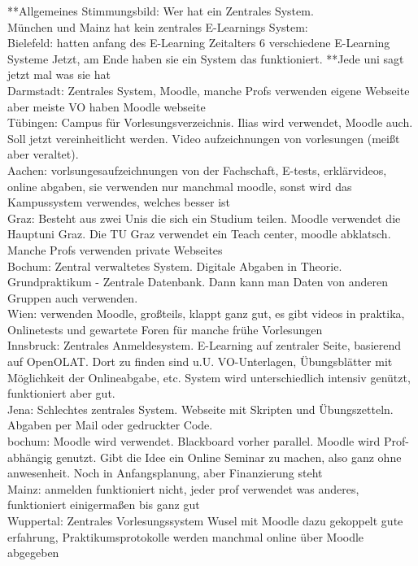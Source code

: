 \begin{itemize}
{\begin{itemize}
**Allgemeines Stimmungsbild: Wer hat ein Zentrales System.
 \\
München und Mainz hat kein zentrales E-Learnings System:  \\
Bielefeld: hatten anfang des E-Learning Zeitalters 6 verschiedene E-Learning Systeme
Jetzt, am Ende haben sie ein System das funktioniert.
**Jede uni sagt jetzt mal was sie hat
 \\
Darmstadt: Zentrales System, Moodle, manche Profs verwenden eigene Webseite aber meiste VO haben Moodle webseite \\
Tübingen: Campus für Vorlesungsverzeichnis. Ilias wird verwendet, Moodle auch. Soll jetzt vereinheitlicht werden. Video aufzeichnungen von vorlesungen (meißt aber veraltet). \\
Aachen: vorlsungesaufzeichnungen von der Fachschaft, E-tests, erklärvideos, online abgaben, sie verwenden nur manchmal moodle, sonst wird das Kampussystem verwendes, welches besser ist \\
Graz: Besteht aus zwei Unis die sich ein Studium teilen. Moodle verwendet die Hauptuni Graz. Die TU Graz verwendet ein Teach center, moodle abklatsch. Manche Profs verwenden private Webseites \\
Bochum: Zentral verwaltetes System. Digitale Abgaben in Theorie. Grundpraktikum - Zentrale Datenbank. Dann kann man Daten von anderen Gruppen auch verwenden. \\
Wien: verwenden Moodle, großteils, klappt ganz gut, es gibt videos in praktika, Onlinetests und gewartete Foren für manche frühe Vorlesungen \\
Innsbruck: Zentrales Anmeldesystem. E-Learning auf zentraler Seite, basierend auf OpenOLAT. Dort zu finden sind u.U. VO-Unterlagen, Übungsblätter mit Möglichkeit der Onlineabgabe, etc. System wird unterschiedlich intensiv genützt, funktioniert aber gut. \\
Jena: Schlechtes zentrales System. Webseite mit Skripten und Übungszetteln.
Abgaben per Mail oder gedruckter Code. \\
bochum: Moodle wird verwendet. Blackboard vorher parallel. Moodle wird Prof-abhängig genutzt. Gibt die Idee ein Online Seminar zu machen, also ganz ohne anwesenheit. Noch in Anfangsplanung, aber Finanzierung steht \\
Mainz: anmelden funktioniert nicht, jeder prof verwendet was anderes, funktioniert einigermaßen bis ganz gut \\
Wuppertal: Zentrales Vorlesungssystem Wusel mit Moodle dazu gekoppelt
gute erfahrung, Praktikumsprotokolle werden manchmal online über Moodle abgegeben

\end{itemize}}
\end{itemize}
